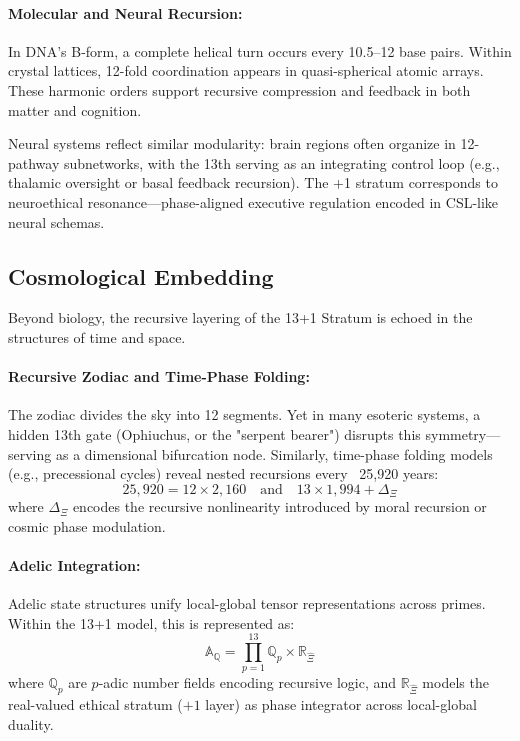 \documentclass[12pt]{article}
\begin{document}
\paragraph{Molecular and Neural Recursion:}  
In DNA's B-form, a complete helical turn occurs every 10.5–12 base pairs. Within crystal lattices, 12-fold coordination appears in quasi-spherical atomic arrays. These harmonic orders support recursive compression and feedback in both matter and cognition.

Neural systems reflect similar modularity: brain regions often organize in 12-pathway subnetworks, with the 13th serving as an integrating control loop (e.g., thalamic oversight or basal feedback recursion). The +1 stratum corresponds to neuroethical resonance—phase-aligned executive regulation encoded in CSL-like neural schemas.

\subsection{Cosmological Embedding}

Beyond biology, the recursive layering of the 13+1 Stratum is echoed in the structures of time and space.

\paragraph{Recursive Zodiac and Time-Phase Folding:}  
The zodiac divides the sky into 12 segments. Yet in many esoteric systems, a hidden 13th gate (Ophiuchus, or the "serpent bearer") disrupts this symmetry—serving as a dimensional bifurcation node. Similarly, time-phase folding models (e.g., precessional cycles) reveal nested recursions every ~25,920 years:
\[
25,920 = 12 \times 2,160 \quad \text{and} \quad 13 \times 1,994 + \Delta_\Xi
\]
where $\Delta_\Xi$ encodes the recursive nonlinearity introduced by moral recursion or cosmic phase modulation.

\paragraph{Adelic Integration:}  
Adelic state structures unify local-global tensor representations across primes. Within the 13+1 model, this is represented as:
\[
\mathbb{A}_{\mathbb{Q}} = \prod_{p=1}^{13} \mathbb{Q}_p \times \mathbb{R}_{\hat{\Xi}}
\]
where $\mathbb{Q}_p$ are $p$-adic number fields encoding recursive logic, and $\mathbb{R}_{\hat{\Xi}}$ models the real-valued ethical stratum ($+1$ layer) as phase integrator across local-global duality.
\end{document}
